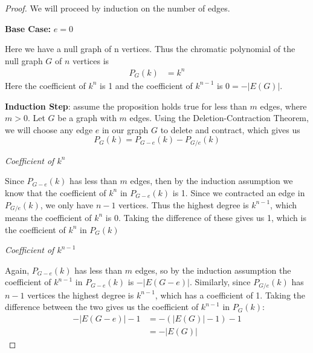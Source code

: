 \documentclass[11pt, oneside]{article}   	%
\begin{document}
\begin{proof}

We will proceed by induction on the number of edges.

\textbf{Base Case:} $e=0$

Here we have a null graph of n vertices. Thus the chromatic polynomial of the null graph $G$ of $n$ vertices is
	\begin{align*}
		P_G(k) & = k^n
	\end{align*}
Here the coefficient of $k^n$ is 1 and the coefficient of $k^{n-1}$ is $0 = - |E(G)|$.

\textbf{Induction Step}: assume the proposition holds true for less than $m$ edges, where $m>0$. Let $G$ be a graph with $m$ edges. Using the Deletion-Contraction Theorem, we will choose any edge $e$ in our graph $G$ to delete and contract, which gives us
$$P_G(k) = P_{G-e}(k) - P_{G/e}(k)$$

\emph{Coefficient of $k^n$}

Since $P_{G-e}(k)$ has less than $m$ edges, then by the induction assumption we know that the coefficient of $k^n$ in $P_{G-e}(k)$ is 1. Since we contracted an edge in $P_{G/e}(k)$, we only have $n-1$ vertices. Thus the highest degree is $k^{n-1}$, which means the coefficient of $k^n$ is 0. Taking the difference of these gives us 1, which is the coefficient of $k^n$ in $P_G(k)$

\emph{Coefficient of $k^{n-1}$}

Again, $P_{G-e}(k)$ has less than $m$ edges, so by the induction assumption the coefficient of $k^{n-1}$ in $P_{G-e}(k)$ is $- |E(G-e)|$. Similarly, since $P_{G/e}(k)$ has $n-1$ vertices the highest degree is $k^{n-1}$, which has a coefficient of 1. Taking the difference between the two gives us the coefficient of $k^{n-1}$ in $P_G(k)$:
	\begin{align*}
		- |E(G-e)| - 1 & = -(|E(G)| - 1) -1 \\
		& =  -|E(G)|
	\end{align*}

\end{proof}




%
\end{document}
